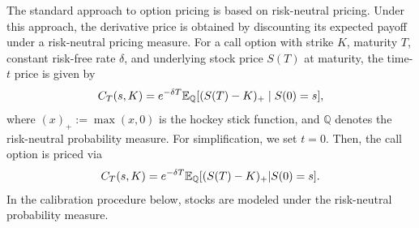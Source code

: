 The standard approach to option pricing is based on risk-neutral pricing. Under this approach, the derivative price is obtained by discounting its expected payoff under a risk-neutral pricing measure. For a call option with strike $K$, maturity $T$, constant risk-free rate $\delta $, and underlying stock price $S(T)$ at maturity, the time-$t$ price is given by
\begin{equation*}
    C_T(s,K)  = e^{-\delta T} \mathbb{E}_\mathbb{Q} [(S(T)-K)_+ \mid S(0)=s],
\end{equation*}
where $(x)_+ := \max (x,0)$ is the hockey stick function, and $\mathbb Q$ denotes the risk-neutral probability measure. For simplification, we set $t=0$. Then, the call option is priced via
\begin{equation}
    C_T(s,K)  = e^{-\delta T} \mathbb{E}_\mathbb{Q} [(S(T)-K)_+ | S(0) = s].
    \label{E: call option pricing formula}
\end{equation}
In the calibration procedure below, stocks are modeled under the risk-neutral probability measure. 

